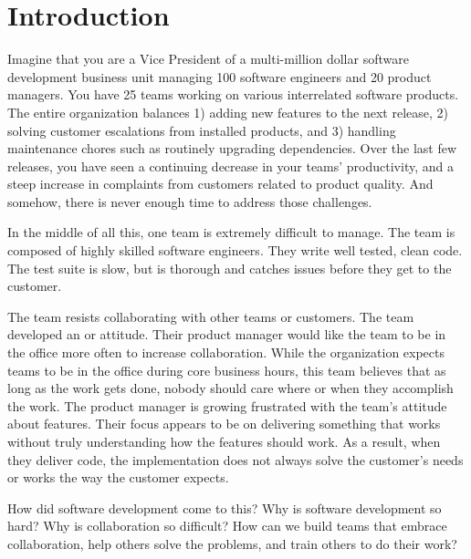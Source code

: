 
\chapter{Introduction}
\label{IntroductionChapter}


Imagine that you are a Vice President of a multi-million dollar software development business unit managing 100 software engineers and 20 product managers. You have 25 teams working on various interrelated software products. The entire organization balances 1) adding new features to the next release, 2) solving customer escalations from installed products, and 3) handling maintenance chores such as routinely upgrading dependencies. Over the last few releases, you have seen a continuing decrease in your teams' productivity, and a steep increase in complaints from customers related to product quality. And somehow, there is never enough time to address those challenges.


In the middle of all this, one team is extremely difficult  to manage. The team is composed of highly skilled software engineers. They write well tested, clean code. The test suite is slow, but is thorough and catches issues before they get to the customer. 


The team resists collaborating with other teams or customers. The team developed an  or  attitude. Their product manager would like the team to be in the office more often to increase collaboration. While the organization expects teams to be in the office during core business hours, this team believes that as long as the work gets done, nobody should care where or when they accomplish the work. The product manager is growing frustrated with the team's attitude about features. Their focus appears to be on delivering something that works without truly understanding how the features should work. As a result, when they deliver code, the implementation does not always solve the customer's needs or works the way the customer expects. 


How did software development come to this? Why is software development so hard? Why is collaboration so difficult? How can we build teams that embrace collaboration, help others solve the problems, and train others to do their work?


